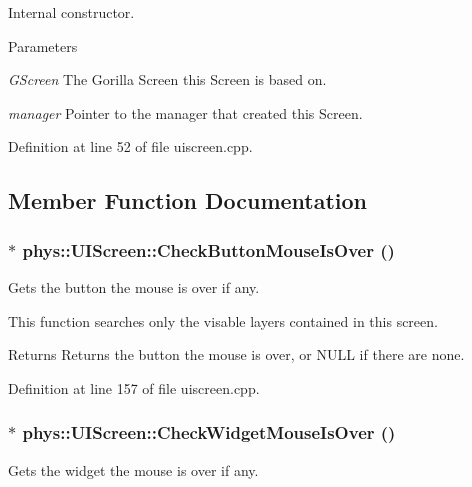 Internal constructor. 


\begin{DoxyParams}{Parameters}
\item[{\em GScreen}]The Gorilla Screen this Screen is based on. \item[{\em manager}]Pointer to the manager that created this Screen. \end{DoxyParams}


Definition at line 52 of file uiscreen.cpp.



\subsection{Member Function Documentation}
\hypertarget{classphys_1_1UIScreen_a7bc1a10b2172ad8885901de1a65a819d}{
\subsubsection[{CheckButtonMouseIsOver}]{ $\ast$ phys::UIScreen::CheckButtonMouseIsOver ()}}
\label{d9/de8/classphys_1_1UIScreen_a7bc1a10b2172ad8885901de1a65a819d}


Gets the button the mouse is over if any. 

This function searches only the visable layers contained in this screen. \begin{DoxyReturn}{Returns}
Returns the button the mouse is over, or NULL if there are none. 
\end{DoxyReturn}


Definition at line 157 of file uiscreen.cpp.

\hypertarget{classphys_1_1UIScreen_a00befef8c7bce9e8d149e6ba03419a53}{
\subsubsection[{CheckWidgetMouseIsOver}]{ $\ast$ phys::UIScreen::CheckWidgetMouseIsOver ()}}
\label{d9/de8/classphys_1_1UIScreen_a00befef8c7bce9e8d149e6ba03419a53}


Gets the widget the mouse is over if any. 

